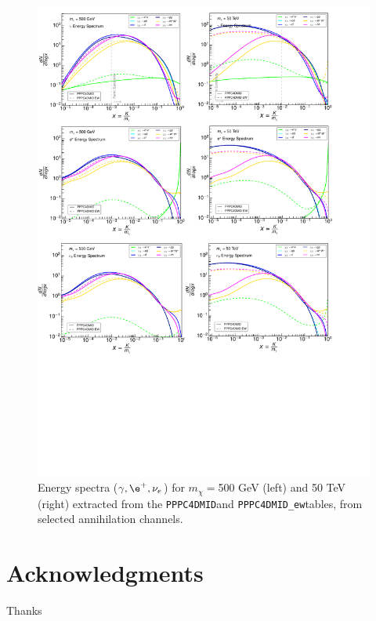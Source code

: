 \documentclass[epj,nopacs,fleqn]{svjour}
\newcommand{\PPPC}{\texttt{PPPC4DMID}}
\newcommand{\PPPCew}{\texttt{PPPC4DMID\_ew}}
\begin{document}
\begin{figure}[!]
\begin{center}
\includegraphics[width=1\textwidth]{Fig/EW_noEW_PPPC.pdf}
\end{center}
\caption{Energy spectra ($\gamma, \e^+, \nu_e$) for $m_{\chi}=$500 GeV (left) and 50 TeV (right) extracted from the \PPPC and \PPPCew tables, from selected annihilation channels.}
\end{figure}







\section*{Acknowledgments}
Thanks



\end{document}
